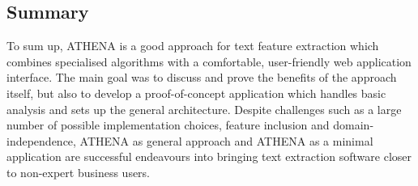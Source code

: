 \documentclass[12pt,a4paper,twoside]{report}
\begin{document}
\subsection*{Summary}
To sum up, ATHENA is a good approach for text feature extraction which combines specialised algorithms with a comfortable, user-friendly web application interface. The main goal was to discuss and prove the benefits of the approach itself, but also to develop a proof-of-concept application which handles basic analysis and sets up the general architecture. Despite challenges such as a large number of possible implementation choices, feature inclusion and domain-independence, ATHENA as general approach and ATHENA as a minimal application are successful endeavours into bringing text extraction software closer to non-expert business users.

 


\end{document}
